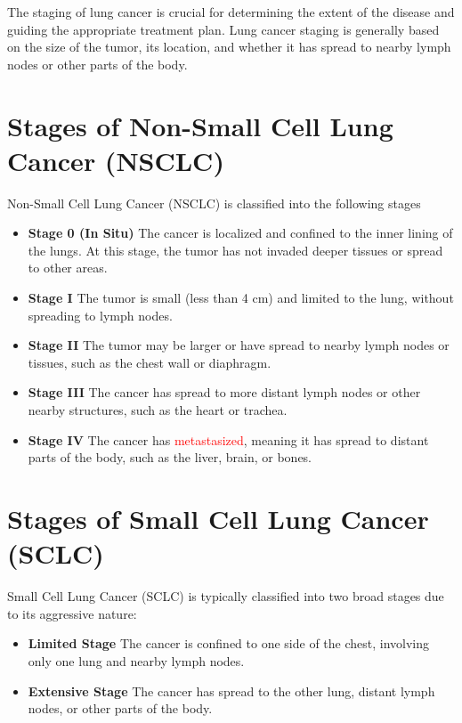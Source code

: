 The staging of lung cancer is crucial for determining the extent of the disease and guiding the appropriate treatment plan. Lung cancer staging is generally based on the size of the tumor, its location, and whether it has spread to nearby lymph nodes or other parts of the body.

\section{Stages of Non-Small Cell Lung Cancer (NSCLC)}
Non-Small Cell Lung Cancer (NSCLC) is classified into the following stages

\begin{itemize}
    \item \textbf{Stage 0 (In Situ)} The cancer is localized and confined to the inner lining of the lungs. At this stage, the tumor has not invaded deeper tissues or spread to other areas.
    \item \textbf{Stage I} The tumor is small (less than 4 cm) and limited to the lung, without spreading to lymph nodes.
    \item \textbf{Stage II} The tumor may be larger or have spread to nearby lymph nodes or tissues, such as the chest wall or diaphragm.
    \item \textbf{Stage III} The cancer has spread to more distant lymph nodes or other nearby structures, such as the heart or trachea.
    \item \textbf{Stage IV} The cancer has \textcolor{red}{metastasized}, meaning it has spread to distant parts of the body, such as the liver, brain, or bones.
\end{itemize}

\section{Stages of Small Cell Lung Cancer (SCLC)} 
Small Cell Lung Cancer (SCLC) is typically classified into two broad stages due to its aggressive nature:

\begin{itemize}
    \item \textbf{Limited Stage} The cancer is confined to one side of the chest, involving only one lung and nearby lymph nodes.
    \item \textbf{Extensive Stage} The cancer has spread to the other lung, distant lymph nodes, or other parts of the body.
\end{itemize}

